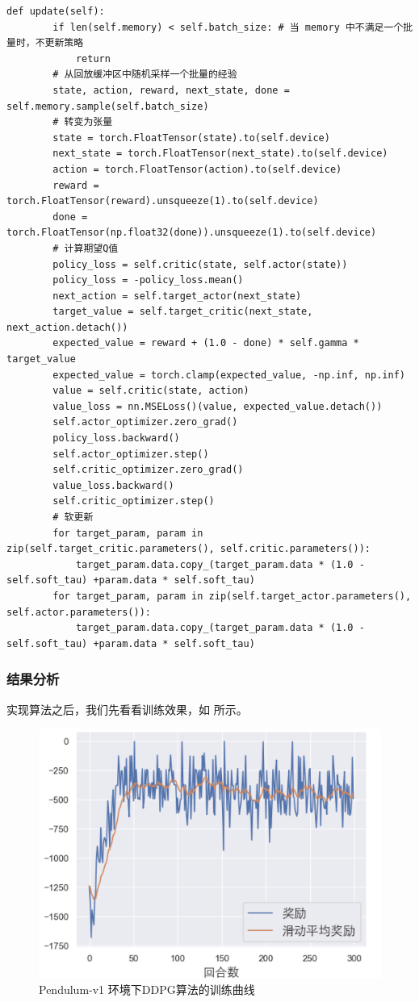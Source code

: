 \begin{lstlisting}[style=Python]
    def update(self):
        if len(self.memory) < self.batch_size: # 当 memory 中不满足一个批量时，不更新策略
            return
        # 从回放缓冲区中随机采样一个批量的经验
        state, action, reward, next_state, done = self.memory.sample(self.batch_size)
        # 转变为张量
        state = torch.FloatTensor(state).to(self.device)
        next_state = torch.FloatTensor(next_state).to(self.device)
        action = torch.FloatTensor(action).to(self.device)
        reward = torch.FloatTensor(reward).unsqueeze(1).to(self.device)
        done = torch.FloatTensor(np.float32(done)).unsqueeze(1).to(self.device)
        # 计算期望Q值
        policy_loss = self.critic(state, self.actor(state))
        policy_loss = -policy_loss.mean()
        next_action = self.target_actor(next_state)
        target_value = self.target_critic(next_state, next_action.detach())
        expected_value = reward + (1.0 - done) * self.gamma * target_value
        expected_value = torch.clamp(expected_value, -np.inf, np.inf)
        value = self.critic(state, action)
        value_loss = nn.MSELoss()(value, expected_value.detach())
        self.actor_optimizer.zero_grad()
        policy_loss.backward()
        self.actor_optimizer.step()
        self.critic_optimizer.zero_grad()
        value_loss.backward()
        self.critic_optimizer.step()
        # 软更新
        for target_param, param in zip(self.target_critic.parameters(), self.critic.parameters()):
            target_param.data.copy_(target_param.data * (1.0 - self.soft_tau) +param.data * self.soft_tau)
        for target_param, param in zip(self.target_actor.parameters(), self.actor.parameters()):
            target_param.data.copy_(target_param.data * (1.0 - self.soft_tau) +param.data * self.soft_tau)
\end{lstlisting}

\subsubsection{结果分析}

实现算法之后，我们先看看训练效果，如 所示。

\begin{figure}[htb]
    \centering
    \includegraphics[width=0.6\linewidth]{res/ch12/assets/train_rewards_curve_cn-1760758.png}
    \caption{Pendulum-v1 环境下DDPG算法的训练曲线}
    \label{fig:train_rewards_curve_cn-1760758}
\end{figure}


